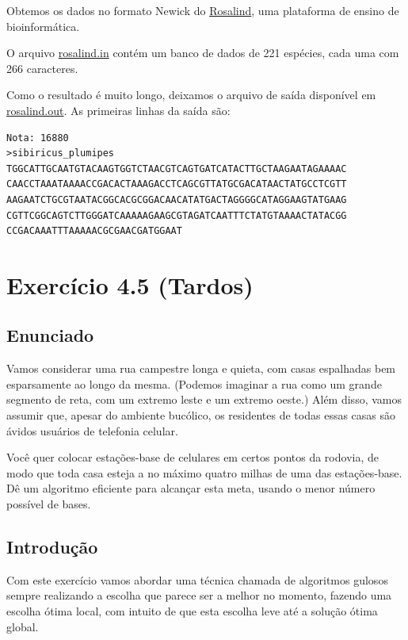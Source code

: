 \documentclass[11pt]{article}
\begin{document}
Obtemos os dados no formato Newick do \href{http://rosalind.info}{Rosalind}, uma plataforma de
ensino de bioinformática.

O arquivo \href{https://github.com/adusca/FGV-EDA/blob/master/6_30/rosalind.in}{rosalind.in} contém um banco de dados de 221 espécies, cada
uma com 266 caracteres.

Como o resultado é muito longo, deixamos o arquivo de saída disponível
em \href{https://github.com/adusca/FGV-EDA/blob/master/6_30/rosalind.out}{rosalind.out}. As primeiras linhas da saída são:

\begin{verbatim}
Nota: 16880
>sibiricus_plumipes
TGGCATTGCAATGTACAAGTGGTCTAACGTCAGTGATCATACTTGCTAAGAATAGAAAAC
CAACCTAAATAAAACCGACACTAAAGACCTCAGCGTTATGCGACATAACTATGCCTCGTT
AAGAATCTGCGTAATACGGCACGCGGACAACATATGACTAGGGGCATAGGAAGTATGAAG
CGTTCGGCAGTCTTGGGATCAAAAAGAAGCGTAGATCAATTTCTATGTAAAACTATACGG
CCGACAAATTTAAAAACGCGAACGATGGAAT
\end{verbatim}
\pagebreak

\section{Exercício 4.5 (Tardos)}
\label{sec-5}

\subsection{Enunciado}
\label{sec-5-1}

Vamos considerar uma rua campestre longa e quieta, com casas
espalhadas bem esparsamente ao longo da mesma. (Podemos imaginar a
rua como um grande segmento de reta, com um extremo leste e um
extremo oeste.) Além disso, vamos assumir que, apesar do ambiente
bucólico, os residentes de todas essas casas são ávidos usuários de
telefonia celular.

Você quer colocar estações-base de celulares em certos pontos da
rodovia, de modo que toda casa esteja a no máximo quatro milhas de
uma das estações-base. Dê um algoritmo eficiente para alcançar esta
meta, usando o menor número possível de bases.

\subsection{Introdução}
\label{sec-5-2}
\label{sec-2}

Com este exercício vamos abordar uma técnica chamada de algoritmos
gulosos sempre realizando a escolha que parece ser a melhor no
momento, fazendo uma escolha ótima local, com intuito de que esta
escolha leve até a solução ótima global.
\end{document}
